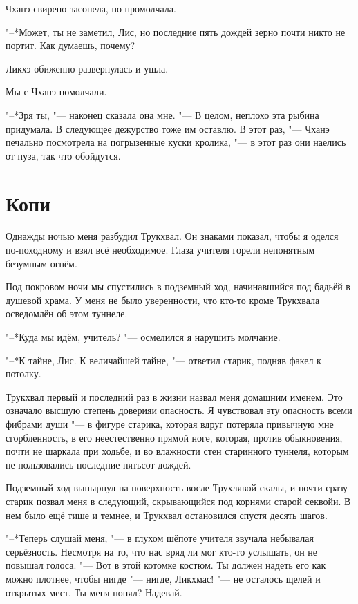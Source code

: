 Чханэ свирепо засопела, но промолчала.

"--*Может, ты не заметил, Лис, но последние пять дождей зерно почти никто не портит.
Как думаешь, почему?

Ликхэ обиженно развернулась и ушла.

Мы с Чханэ помолчали.

"--*Зря ты, "--- наконец сказала она мне.
"--- В целом, неплохо эта рыбина придумала.
В следующее дежурство тоже им оставлю.
В этот раз, "--- Чханэ печально посмотрела на погрызенные куски кролика, "--- в этот раз они наелись от пуза, так что обойдутся.

\section{Копи}

Однажды ночью меня разбудил Трукхвал.
Он знаками показал, чтобы я оделся по-походному и взял всё необходимое.
Глаза учителя горели непонятным безумным огнём.

Под покровом ночи мы спустились в подземный ход, начинавшийся под бадьёй в душевой храма.
У меня не было уверенности, что кто-то кроме Трукхвала осведомлён об этом туннеле.

"--*Куда мы идём, учитель? "--- осмелился я нарушить молчание.

"--*К тайне, Лис.
К величайшей тайне, "--- ответил старик, подняв факел к потолку.

Трукхвал первый и последний раз в жизни назвал меня домашним именем.
Это означало высшую степень доверия\ldotst и опасность.
Я чувствовал эту опасность всеми фибрами души "--- в фигуре старика, которая вдруг потеряла привычную мне сгорбленность, в его неестественно прямой ноге, которая, против обыкновения, почти не шаркала при ходьбе, и во влажности стен старинного туннеля, которым не пользовались последние пятьсот дождей.

Подземный ход вынырнул на поверхность восле Трухлявой скалы, и почти сразу старик позвал меня в следующий, скрывающийся под корнями старой секвойи.
В нем было ещё тише и темнее, и Трукхвал остановился спустя десять шагов.

"--*Теперь слушай меня, "--- в глухом шёпоте учителя звучала небывалая серьёзность.
Несмотря на то, что нас вряд ли мог кто-то услышать, он не повышал голоса.
"--- Вот в этой котомке костюм.
Ты должен надеть его как можно плотнее, чтобы нигде "--- нигде, Ликхмас! "--- не осталось щелей и открытых мест.
Ты меня понял?
Надевай.

